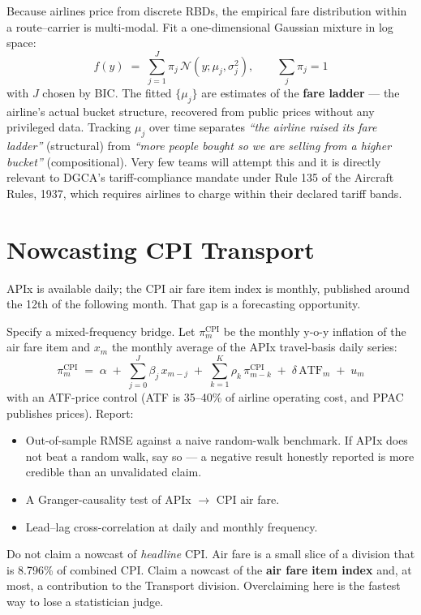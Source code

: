 Because airlines price from discrete RBDs, the empirical fare distribution within a
route--carrier is multi-modal. Fit a one-dimensional Gaussian mixture in log space:
\begin{equation}
f(y) \;=\; \sum_{j=1}^{J}\pi_j\,\mathcal{N}\!\left(y;\mu_j,\sigma_j^2\right),
\qquad \sum_j \pi_j = 1
\end{equation}
with $J$ chosen by BIC. The fitted $\{\mu_j\}$ are estimates of the \textbf{fare ladder} ---
the airline's actual bucket structure, recovered from public prices without any privileged
data. Tracking $\mu_j$ over time separates \emph{``the airline raised its fare ladder''}
(structural) from \emph{``more people bought so we are selling from a higher bucket''}
(compositional). Very few teams will attempt this and it is directly relevant to DGCA's
tariff-compliance mandate under Rule 135 of the Aircraft Rules, 1937, which requires
airlines to charge within their declared tariff bands.

\section{Nowcasting CPI Transport}

APIx is available daily; the CPI air fare item index is monthly, published around the 12th
of the following month. That gap is a forecasting opportunity.

Specify a mixed-frequency bridge. Let $\pi^{\text{CPI}}_m$ be the monthly y-o-y inflation of
the air fare item and $x_m$ the monthly average of the APIx travel-basis daily series:
\begin{equation}
\pi^{\text{CPI}}_m \;=\; \alpha \;+\; \sum_{j=0}^{J}\beta_j\, x_{m-j}
\;+\; \sum_{k=1}^{K}\rho_k\,\pi^{\text{CPI}}_{m-k}
\;+\; \delta\,\text{ATF}_{m}
\;+\; u_m
\end{equation}
with an ATF-price control (ATF is 35--40\% of airline operating cost, and PPAC publishes
prices). Report:
\begin{itemize}
\item Out-of-sample RMSE against a naive random-walk benchmark. If APIx does not beat a
random walk, say so --- a negative result honestly reported is more credible than an
unvalidated claim.
\item A Granger-causality test of APIx $\to$ CPI air fare.
\item Lead--lag cross-correlation at daily and monthly frequency.
\end{itemize}

\begin{warnbox}
Do not claim a nowcast of \emph{headline} CPI. Air fare is a small slice of a division that
is 8.796\% of combined CPI. Claim a nowcast of the \textbf{air fare item index} and, at
most, a contribution to the Transport division. Overclaiming here is the fastest way to lose
a statistician judge.
\end{warnbox}

